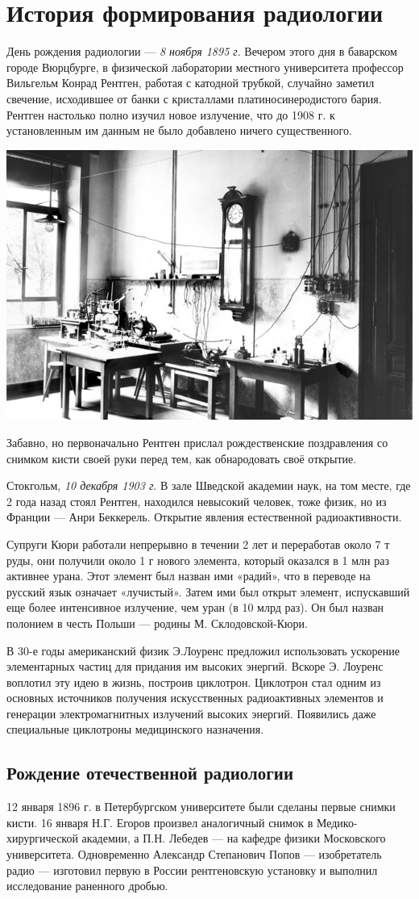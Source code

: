 \documentclass[14pt,a4paper]{article}
\begin{document}
\section{История формирования радиологии}
День рождения радиологии --- \emph{8 ноября 1895 г}. Вечером этого дня в баварском городе Вюрцбурге, в физической лаборатории местного университета профессор Вильгельм Конрад Рентген, работая с катодной трубкой, случайно заметил свечение, исходившее от банки с кристаллами платиносинеродистого бария. Рентген настолько полно изучил новое излучение, что до 1908 г. к установленным им данным не было добавлено ничего существенного.
\begin{center}
    \includegraphics[width=.4\textwidth]{RentgenLab}
\end{center}

Забавно, но первоначально Рентген прислал рождественские поздравления со снимком кисти своей руки перед тем, как обнародовать своё открытие.

Стокгольм, \emph{10 декабря 1903 г}. В зале Шведской академии наук, на том
месте, где 2 года назад стоял Рентген, находился невысокий человек, тоже
физик, но из Франции — Анри Беккерель. Открытие явления естественной радиоактивности.

Супруги Кюри работали непрерывно в течении 2 лет и переработав около 7 т руды, они получили
около 1 г нового элемента, который оказался в 1 млн раз активнее урана.
Этот элемент был назван ими «радий», что в переводе на русский язык означает «лучистый». Затем ими был открыт элемент, испускавший еще более интенсивное излучение, чем уран (в 10 млрд раз).
Он был назван полонием в честь Польши — родины М. Склодовской-Кюри.

В 30-е годы американский физик Э.Лоуренс предложил использовать ускорение элементарных частиц для придания им высоких энергий. Вскоре Э. Лоуренс воплотил эту идею в жизнь, построив циклотрон. Циклотрон стал одним из основных источников получения искусственных радиоактивных элементов и генерации электромагнитных излучений высоких энергий. Появились даже специальные циклотроны медицинского назначения.

\subsection{Рождение отечественной радиологии}
12 января 1896 г. в Петербургском университете были сделаны первые
снимки кисти. 16 января Н.Г. Егоров произвел аналогичный снимок в Медико-хирургической академии, а П.Н. Лебедев — на кафедре физики Московского университета. Одновременно Александр Степанович Попов — изобретатель радио —
изготовил первую в России рентгеновскую установку и выполнил исследование раненного дробью.
\end{document}
